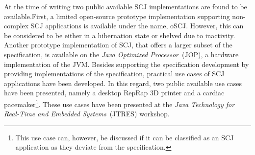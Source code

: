 At the time of writing two public available SCJ implementations are found to be available.First, a limited open-source prototype implementation supporting non-complex SCJ applications is available under the name, oSCJ\cite{oSCJ}. However, this can be considered to be either in a hibernation state or shelved due to inactivity. Another prototype implementation of SCJ, that offers a larger subset of the specification, is available on the \textit{Java Optimized Processor}~(JOP), a hardware implementation of the JVM\cite{Schoeberl:2012:SCJonJava}. Besides supporting the specification development by providing implementations of the specification, practical use cases of SCJ applications have been developed. In this regard, two public available use cases have been presented, namely a desktop RepRap 3D printer\cite{Schoeberl:2012:RepRap} and a cardiac pacemaker\cite{Singh:2012:CPC:2388936.2388948}\footnote{This use case can, however, be discussed if it can be classified as an SCJ application as they deviate from the specification.}. These use cases have been presented at the \textit{Java Technology for Real-Time and Embedded Systems}~(JTRES) workshop.



